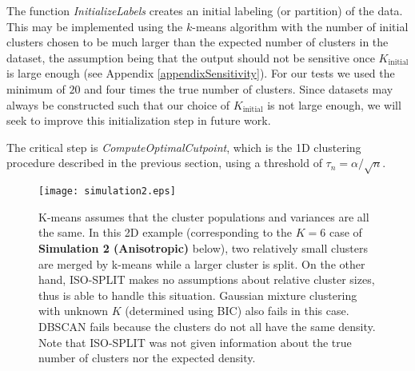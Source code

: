 \documentclass[10pt]{article}
\begin{document}
The function \emph{InitializeLabels} creates an initial labeling (or partition) of the data. This may be implemented using the $k$-means algorithm with the number of initial clusters chosen to be much larger than the expected number of clusters in the dataset, the assumption being that the output should not be sensitive once $K_\text{initial}$ is large enough (see Appendix \ref{appendixSensitivity}). For our tests we used the minimum of $20$ and four times the true number of clusters. Since datasets may always be constructed such that our choice of $K_\text{initial}$ is not large enough, we will seek to improve this initialization step in future work.

The critical step is \emph{ComputeOptimalCutpoint}, which is the 1D clustering procedure described in the previous section, using a threshold of $\tau_n=\alpha/\sqrt{n}$.


\begin{figure}
\begin{center}
\texttt{[image: simulation2.eps]}
\end{center}
\caption{
K-means assumes that the cluster populations and variances are all the same. In this 2D example (corresponding to the $K=6$ case of \textbf{Simulation 2 (Anisotropic)} below), two relatively small clusters are merged by k-means while a larger cluster is split. On the other hand, ISO-SPLIT makes no assumptions about relative cluster sizes, thus is able to handle this situation. Gaussian mixture clustering with unknown $K$ (determined using BIC) also fails in this case. DBSCAN fails because the clusters do not all have the same density. Note that ISO-SPLIT was not given information about the true number of clusters nor the expected density.
}
\label{fig:simulation2}
\end{figure}
\end{document}

